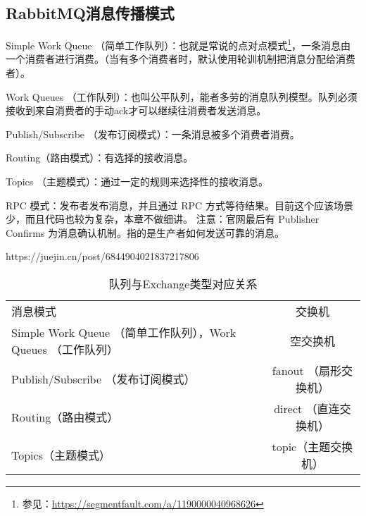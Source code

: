 \documentclass[../../../interview-questions.tex]{subfiles}
\begin{document}
\subsection{RabbitMQ消息传播模式}

Simple Work Queue （简单工作队列）：也就是常说的点对点模式\footnote{参见：\url{https://segmentfault.com/a/1190000040968626}}，一条消息由一个消费者进行消费。（当有多个消费者时，默认使用轮训机制把消息分配给消费者）。

Work Queues （工作队列）：也叫公平队列，能者多劳的消息队列模型。队列必须接收到来自消费者的手动ack才可以继续往消费者发送消息。

Publish/Subscribe （发布订阅模式）：一条消息被多个消费者消费。

Routing（路由模式）：有选择的接收消息。

Topics （主题模式）：通过一定的规则来选择性的接收消息。

RPC 模式：发布者发布消息，并且通过 RPC 方式等待结果。目前这个应该场景少，而且代码也较为复杂，本章不做细讲。
注意：官网最后有 Publisher Confirms 为消息确认机制。指的是生产者如何发送可靠的消息。

https://juejin.cn/post/6844904021837217806


\begin{table}[htbp]
	\caption{队列与Exchange类型对应关系}
	\label{table:queueexchange}
	\begin{center}
		\begin{tabular}{p{6cm}c}
			\hline
			\multirow{1}{*}{消息模式}
			& \multicolumn{1}{c}{交换机} \\			
			\cline{1-2}
			Simple Work Queue （简单工作队列），Work Queues （工作队列） &  空交换机   \\
			\hline
			Publish/Subscribe （发布订阅模式） &  fanout （扇形交换机）  \\
			\hline
			Routing（路由模式） &  direct （直连交换机） \\
			\hline	
            Topics（主题模式） &  topic（主题交换机） \\
			\hline						
		\end{tabular}	
	\end{center}
\end{table}
\end{document}
